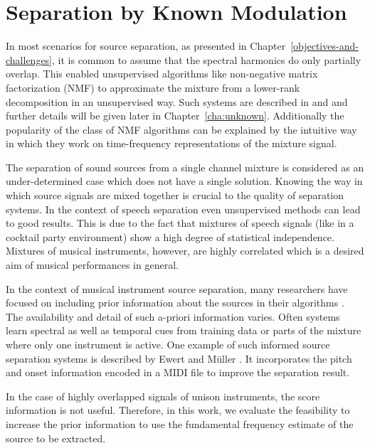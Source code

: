 \chapter{Separation by Known Modulation}
\label{cha:known}


In most scenarios for source separation, as presented in Chapter~\ref{objectives-and-challenges}, it is common to assume that the spectral harmonics do only partially overlap.
This enabled unsupervised algorithms like non-negative matrix factorization (NMF) to approximate the mixture from a lower-rank decomposition in an unsupervised way.
Such systems are described in \cite{smaragdis03} and \cite{virtanen07} and further details will be given later in Chapter~\ref{cha:unknown}.
Additionally the popularity of the class of NMF algorithms can be explained by the intuitive way in which they work on time-frequency representations of the mixture signal.
\par
The separation of sound sources from a single channel mixture is considered as an under-determined case which does not have a single solution. Knowing the way in which source signals are mixed together is crucial to the quality of separation systems. In the context of speech separation even unsupervised methods can lead to good results. This is due to the fact that mixtures of speech signals (like in a cocktail party environment) show a high degree of statistical independence. Mixtures of musical instruments, however, are highly correlated which is a desired aim of musical performances in general.

In the context of musical instrument source separation, many researchers have focused on including prior information about the sources in their algorithms \cite{ozerov12}.
The availability and detail of such a-priori information varies. Often systems learn spectral as well as temporal cues from training data or parts of the mixture where only one instrument is active.
One example of such informed source separation systems is described by Ewert and M\"uller \cite{ewert12}.
It incorporates the pitch and onset information encoded in a MIDI file to improve the separation result.

In the case of highly overlapped signals of unison instruments, the score information is not useful.
Therefore, in this work, we evaluate the feasibility to increase the prior information to use the fundamental frequency estimate of the source to be extracted.

